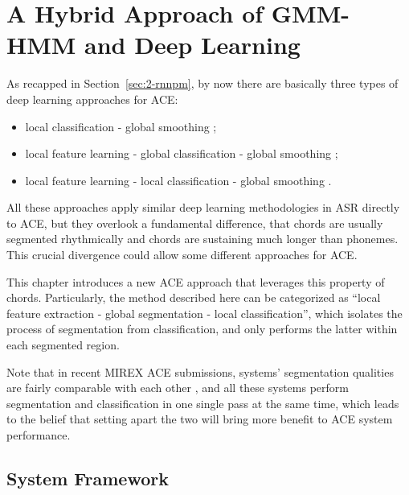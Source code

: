 
\chapter{A Hybrid Approach of GMM-HMM and Deep Learning}\label{cp:ghmm} %


As recapped in Section~\ref{sec:2-rnnpm}, by now there are basically three types of deep learning approaches for ACE:
\begin{itemize}
\item local classification - global smoothing \cite{humphrey2012rethinking};
\item local feature learning - global classification - global smoothing \cite{boulanger2013audio,sigtia2015audio};
\item local feature learning - local classification - global smoothing \cite{zhou2015chord}.
\end{itemize}
All these approaches apply similar deep learning methodologies in ASR \cite{deng2014deep,bourlard2012connectionist} directly to ACE, but they overlook a fundamental difference, that chords are usually segmented rhythmically and chords are sustaining much longer than phonemes. This crucial divergence could allow some different approaches for ACE.

This chapter introduces a new ACE approach that leverages this property of chords. Particularly, the method described here can be categorized as ``local feature extraction - global segmentation - local classification'', which isolates the process of segmentation from classification, and only performs the latter within each segmented region.

Note that in recent MIREX ACE submissions, systems' segmentation qualities are fairly comparable with each other \cite{burgoyne2014comparative}, and all these systems perform segmentation and classification in one single pass at the same time, which leads to the belief that setting apart the two will bring more benefit to ACE system performance.


\section{System Framework} \label{sec:3-sysframe}

